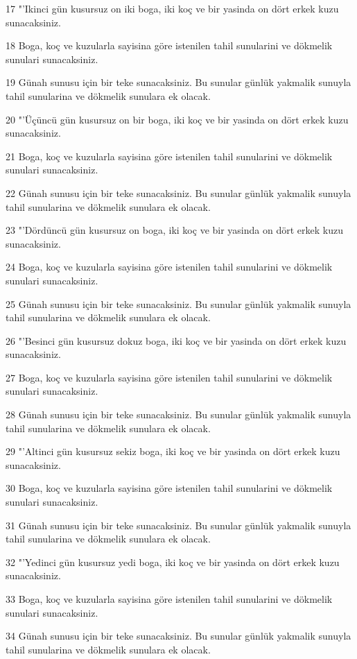 \par 17 "'Ikinci gün kusursuz on iki boga, iki koç ve bir yasinda on dört erkek kuzu sunacaksiniz.
\par 18 Boga, koç ve kuzularla sayisina göre istenilen tahil sunularini ve dökmelik sunulari sunacaksiniz.
\par 19 Günah sunusu için bir teke sunacaksiniz. Bu sunular günlük yakmalik sunuyla tahil sunularina ve dökmelik sunulara ek olacak.
\par 20 "'Üçüncü gün kusursuz on bir boga, iki koç ve bir yasinda on dört erkek kuzu sunacaksiniz.
\par 21 Boga, koç ve kuzularla sayisina göre istenilen tahil sunularini ve dökmelik sunulari sunacaksiniz.
\par 22 Günah sunusu için bir teke sunacaksiniz. Bu sunular günlük yakmalik sunuyla tahil sunularina ve dökmelik sunulara ek olacak.
\par 23 "'Dördüncü gün kusursuz on boga, iki koç ve bir yasinda on dört erkek kuzu sunacaksiniz.
\par 24 Boga, koç ve kuzularla sayisina göre istenilen tahil sunularini ve dökmelik sunulari sunacaksiniz.
\par 25 Günah sunusu için bir teke sunacaksiniz. Bu sunular günlük yakmalik sunuyla tahil sunularina ve dökmelik sunulara ek olacak.
\par 26 "'Besinci gün kusursuz dokuz boga, iki koç ve bir yasinda on dört erkek kuzu sunacaksiniz.
\par 27 Boga, koç ve kuzularla sayisina göre istenilen tahil sunularini ve dökmelik sunulari sunacaksiniz.
\par 28 Günah sunusu için bir teke sunacaksiniz. Bu sunular günlük yakmalik sunuyla tahil sunularina ve dökmelik sunulara ek olacak.
\par 29 "'Altinci gün kusursuz sekiz boga, iki koç ve bir yasinda on dört erkek kuzu sunacaksiniz.
\par 30 Boga, koç ve kuzularla sayisina göre istenilen tahil sunularini ve dökmelik sunulari sunacaksiniz.
\par 31 Günah sunusu için bir teke sunacaksiniz. Bu sunular günlük yakmalik sunuyla tahil sunularina ve dökmelik sunulara ek olacak.
\par 32 "'Yedinci gün kusursuz yedi boga, iki koç ve bir yasinda on dört erkek kuzu sunacaksiniz.
\par 33 Boga, koç ve kuzularla sayisina göre istenilen tahil sunularini ve dökmelik sunulari sunacaksiniz.
\par 34 Günah sunusu için bir teke sunacaksiniz. Bu sunular günlük yakmalik sunuyla tahil sunularina ve dökmelik sunulara ek olacak.
